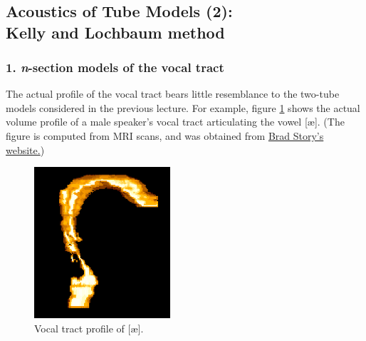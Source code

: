 
\chapter*{}
\section*{\LARGE Acoustics of Tube Models (2):\\ Kelly and Lochbaum method}

\label{atm}

\subsection*{1. \textit{n}-section models of the vocal tract}

The actual profile of the vocal tract bears little resemblance to the two-tube models considered in the previous lecture. For example, figure \ref{f1} shows the actual volume profile of a male speaker's vocal tract articulating the vowel {[}\ae {]}. (The figure is computed from MRI scans, and was obtained from \href{https://slhs.arizona.edu/person/brad-story-phd}{Brad Story's website.})

\captionsetup[figure]{list=no}
\setcounter{figure}{0}
\makeatletter 
\renewcommand{\thefigure}{\@arabic\c@figure}
\makeatother

\begin{figure}[htbp]
\begin{center}
\includegraphics[width=0.45\textwidth]{mp/img/male-ae.png}
\caption{Vocal tract profile of {[}\ae {]}.}
\label{f1}
\end{center}
\end{figure}


